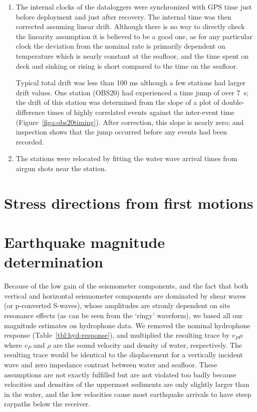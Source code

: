 \documentclass[reviewcopy]{elsart}
\begin{document}
\begin{enumerate}
\item 
The internal clocks of the dataloggers were synchronized with GPS time
just before deployment and just after recovery. The internal time was
then corrected assuming linear drift.  Although there is no way to
directly check the linearity assumption it is believed to be a good
one, as for any particular clock the deviation from the nominal rate
is primarily dependent on temperature which is nearly constant at the
seafloor, and the time spent on deck and sinking or rising is short
compared to the time on the seafloor.

 Typical total drift was less than
100 ms although a few stations had larger drift values.  One station
(OBS20) had experienced a time jump of over 7~s; 
the drift of this
station was determined from the slope of a plot of double-difference
times of highly correlated events against the inter-event time
(Figure~\ref{figa:obs20timing}).  After correction, this slope is
nearly zero; and inspection shows that the jump occurred before any
events had been recorded. 
 
\item The stations were relocated by fitting the water wave arrival
times from airgun shots near the station. 
\end{enumerate}

\section{Stress directions from first motions}

\section{Earthquake magnitude determination}
\label{sec:magnitude}

Because of the low gain of the seismometer components, and the fact
that both vertical and horizontal seismometer components are dominated
by shear waves (or p-converted S-waves), whose amplitudes are stronly
dependent on site resonance effects (as can be seen from the `ringy'
waveform), we based all our magnitude estimates on hydrophone data.
We removed the nominal hydrophone response
(Table~\ref{tbl:hyd-response}), and multiplied the resulting trace by
$v_P \rho$ where $v_P$ and $\rho$ are the sound velocity and density
of water, respectively. The resulting trace would be identical to the
displacement for a vertically incident wave and zero impedance contrast
between water and seafloor.  These assumptions are not exactly
fulfilled but are not violated too badly because velocities and
densities of the uppermost sediments are only slightly larger than in
the water, and the low velocities cause most earthquake arrivals to
have steep raypaths below the receiver.  
\end{document}

